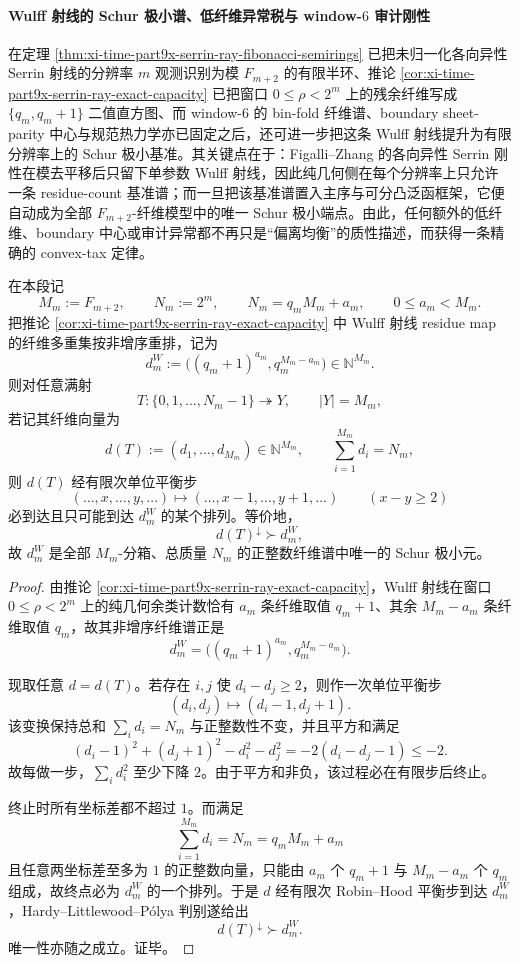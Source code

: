 \paragraph{Wulff 射线的 Schur 极小谱、低纤维异常税与 window-\texorpdfstring{$6$}{6} 审计刚性}
在定理 \ref{thm:xi-time-part9x-serrin-ray-fibonacci-semirings} 已把未归一化各向异性 Serrin 射线的分辨率 \(m\) 观测识别为模 \(F_{m+2}\) 的有限半环、推论 \ref{cor:xi-time-part9x-serrin-ray-exact-capacity} 已把窗口 \(0\le \rho<2^m\) 上的残余纤维写成 \(\{q_m,q_m+1\}\) 二值直方图、而 window-\(6\) 的 bin-fold 纤维谱、boundary sheet-parity 中心与规范热力学亦已固定之后，还可进一步把这条 Wulff 射线提升为有限分辨率上的 Schur 极小基准。其关键点在于：Figalli--Zhang 的各向异性 Serrin 刚性在模去平移后只留下单参数 Wulff 射线，因此纯几何侧在每个分辨率上只允许一条 residue-count 基准谱；而一旦把该基准谱置入主序与可分凸泛函框架，它便自动成为全部 \(F_{m+2}\)-纤维模型中的唯一 Schur 极小端点。由此，任何额外的低纤维、boundary 中心或审计异常都不再只是“偏离均衡”的质性描述，而获得一条精确的 convex-tax 定律。 \cite{FigalliZhang2026AnisotropicSerrinGeneralDomains}

\begin{theorem}\label{thm:xi-time-part9ze-wulff-schur-minimal-spectrum}
在本段记
\[
M_m:=F_{m+2},\qquad
N_m:=2^m,\qquad
N_m=q_mM_m+a_m,\qquad
0\le a_m<M_m.
\]
把推论 \ref{cor:xi-time-part9x-serrin-ray-exact-capacity} 中 Wulff 射线 residue map 的纤维多重集按非增序重排，记为
\[
d_m^W:=\bigl((q_m+1)^{a_m},q_m^{M_m-a_m}\bigr)\in \mathbb N^{M_m}.
\]
则对任意满射
\[
T:\{0,1,\dots,N_m-1\}\twoheadrightarrow Y,
\qquad |Y|=M_m,
\]
若记其纤维向量为
\[
d(T):=(d_1,\dots,d_{M_m})\in \mathbb N^{M_m},
\qquad
\sum_{i=1}^{M_m}d_i=N_m,
\]
则 \(d(T)\) 经有限次单位平衡步
\[
(\ldots,x,\ldots,y,\ldots)\longmapsto
(\ldots,x-1,\ldots,y+1,\ldots)
\qquad (x-y\ge 2)
\]
必到达且只可能到达 \(d_m^W\) 的某个排列。等价地，
\[
d(T)^\downarrow \succ d_m^W,
\]
故 \(d_m^W\) 是全部 \(M_m\)-分箱、总质量 \(N_m\) 的正整数纤维谱中唯一的 Schur 极小元。
\end{theorem}
\begin{proof}
由推论 \ref{cor:xi-time-part9x-serrin-ray-exact-capacity}，Wulff 射线在窗口 \(0\le \rho<2^m\) 上的纯几何余类计数恰有 \(a_m\) 条纤维取值 \(q_m+1\)、其余 \(M_m-a_m\) 条纤维取值 \(q_m\)，故其非增序纤维谱正是
\[
d_m^W=\bigl((q_m+1)^{a_m},q_m^{M_m-a_m}\bigr).
\]

现取任意 \(d=d(T)\)。若存在 \(i,j\) 使 \(d_i-d_j\ge 2\)，则作一次单位平衡步
\[
(d_i,d_j)\mapsto (d_i-1,d_j+1).
\]
该变换保持总和 \(\sum_i d_i=N_m\) 与正整数性不变，并且平方和满足
\[
(d_i-1)^2+(d_j+1)^2-d_i^2-d_j^2
=-2(d_i-d_j-1)\le -2.
\]
故每做一步，\(\sum_i d_i^2\) 至少下降 \(2\)。由于平方和非负，该过程必在有限步后终止。

终止时所有坐标差都不超过 \(1\)。而满足
\[
\sum_{i=1}^{M_m}d_i=N_m=q_mM_m+a_m
\]
且任意两坐标差至多为 \(1\) 的正整数向量，只能由 \(a_m\) 个 \(q_m+1\) 与 \(M_m-a_m\) 个 \(q_m\) 组成，故终点必为 \(d_m^W\) 的一个排列。于是 \(d\) 经有限次 Robin--Hood 平衡步到达 \(d_m^W\)，Hardy--Littlewood--Pólya 判别遂给出
\[
d(T)^\downarrow\succ d_m^W.
\]
唯一性亦随之成立。证毕。
\end{proof}

